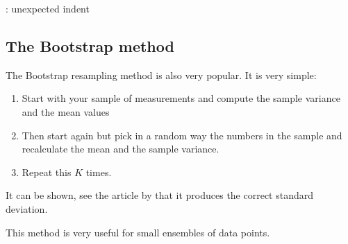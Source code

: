 \documentclass[letterpaper,10pt,english]{sphinxmanual}
\begin{document}
\begin{sphinxVerbatim}[commandchars=\\\{\}]
          \PYG{p}{[}\PYG{p}{]}
          \PYG{p}{[}\PYG{p}{]}
          
\end{sphinxVerbatim}

\begin{sphinxVerbatim}[commandchars=\\\{\}]
: unexpected indent
\end{sphinxVerbatim}


\subsection{The Bootstrap method}
\label{\detokenize{chapter3:the-bootstrap-method}}
The Bootstrap  resampling method is also very popular. It is very simple:
\begin{enumerate}
%
\item {} 
Start with your sample of measurements and compute the sample variance and the mean values

\item {} 
Then start again but pick in a random way the numbers in the sample and recalculate the mean and the sample variance.

\item {} 
Repeat this \(K\) times.

\end{enumerate}

It can be shown, see the article by 
that it produces the correct standard deviation.

This method is very useful for small ensembles of data points.
\end{document}
